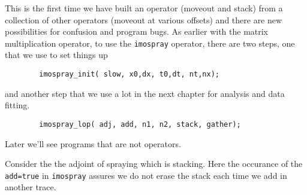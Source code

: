 \par
This is the first time we have built an operator (moveout and stack)
from a collection of other operators (moveout at various offsets)
and there are new possibilities for confusion and program bugs.
As earlier with the matrix multiplication operator,
to use the \texttt{imospray} operator,
there are two steps, one that we use to set things up
\begin{verbatim}
        imospray_init( slow, x0,dx, t0,dt, nt,nx);
\end{verbatim}
and another step that we use a lot in the next chapter
for analysis and data fitting.
\begin{verbatim}
        imospray_lop( adj, add, n1, n2, stack, gather);
\end{verbatim}
Later we'll see programs that are not operators.
\begin{comment}
Every program that is an operator
(contains {\tt {\#}{\%} {\_}init}
      and {\tt {\#}{\%} {\_}lop})
is expanded by Loptran to a longer Fortran code
where the
      {\tt {\_}lop}
function begins by
(potentially) erasing the output (when \texttt{add=.false.}).
This
potential erasing is done in both
\texttt{hypotenusei} and
\texttt{imospray}.
\end{comment}
Consider the the adjoint of spraying which is stacking.
Here the occurance of the
\texttt{add=true} in
\texttt{imospray} assures we do not erase the stack each time
we add in another trace.
\begin{comment}
Because of Loptran we don't explicitly see that
\texttt{imospray\_lop}
has its own potential erase of its output
which we'd turn off if we wanted to add one stack upon another.
\end{comment}

